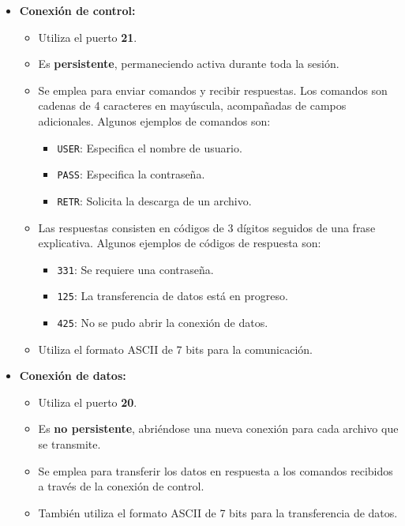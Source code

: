 \documentclass{article}
\begin{document}
\begin{itemize}
    \item \textbf{Conexión de control:} 
    \begin{itemize}
        \item Utiliza el puerto \textbf{21}.
        \item Es \textbf{persistente}, permaneciendo activa durante toda la sesión.
        \item Se emplea para enviar comandos y recibir respuestas. Los comandos son cadenas de 4 caracteres en mayúscula, acompañadas de campos adicionales. Algunos ejemplos de comandos son:
        \begin{itemize}
            \item \texttt{USER}: Especifica el nombre de usuario.
            \item \texttt{PASS}: Especifica la contraseña.
            \item \texttt{RETR}: Solicita la descarga de un archivo.
        \end{itemize}
        \item Las respuestas consisten en códigos de 3 dígitos seguidos de una frase explicativa. Algunos ejemplos de códigos de respuesta son:
        \begin{itemize}
            \item \texttt{331}: Se requiere una contraseña.
            \item \texttt{125}: La transferencia de datos está en progreso.
            \item \texttt{425}: No se pudo abrir la conexión de datos.
        \end{itemize}
        \item Utiliza el formato ASCII de 7 bits para la comunicación.
    \end{itemize}

    \item \textbf{Conexión de datos:}
    \begin{itemize}
        \item Utiliza el puerto \textbf{20}.
        \item Es \textbf{no persistente}, abriéndose una nueva conexión para cada archivo que se transmite.
        \item Se emplea para transferir los datos en respuesta a los comandos recibidos a través de la conexión de control.
        \item También utiliza el formato ASCII de 7 bits para la transferencia de datos.
    \end{itemize}
\end{itemize}
\end{document}
